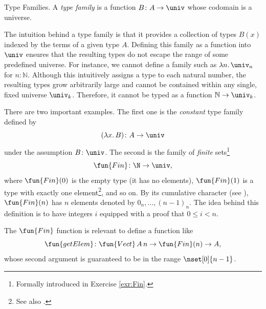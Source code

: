 \begin{lpar}{Type Families.}\label{lpar:type-families}
    A \textsl{type family} is a function $B\colon A\to\univ$ whose codomain is a universe.

    {\small The intuition behind a type family is that it provides a collection of types $B(x)$ indexed by the terms of a given type $A$. Defining this family as a function into $\univ$ ensures that the resulting types do not escape the range of some predefined universe. For instance, we cannot define a family such as $\lambda n.\,\univ_n$ for $n\colon\mathbb{N}$. Although this intuitively assigns a type to each natural number, the resulting types grow arbitrarily large and cannot be contained within any single, fixed universe $\univ_k$. Therefore, it cannot be typed as a function $\mathbb{N}\to\univ_k$.}
    
    There are two important examples. The first one is the \textsl{constant} type family defined by
    \[
        (\lambda x.\,B)\colon A\to\univ
    \]
    under the assumption $B\colon\univ$. The second is the family of \textsl{finite} sets\footnote{Formally introduced in Exercise \ref{exr:Fin}.}
    \[
        \fun{Fin}\colon\N\to\univ,
    \]
    where $\fun{Fin}(0)$ is the empty type (it has no elements), $\fun{Fin}(1)$ is a type with exactly one element\footnote{See also .}, and so on. By its cumulative character (see ), $\fun{Fin}(n)$ has $n$ elements denoted by $0_n,\dots,(n-1)_n$. The idea behind this definition is to have integers $i$ equipped with a proof that $0\le i<n$.

    The $\fun{Fin}$ function is relevant to define a function like
    \[
        \fun{getElem}\colon\fun{Vect}\,A\, n\to\fun{Fin}(n)\to A,
    \]
    whose second argument is guaranteed to be in the range $\nset[0]{n-1}$.
\end{lpar}

